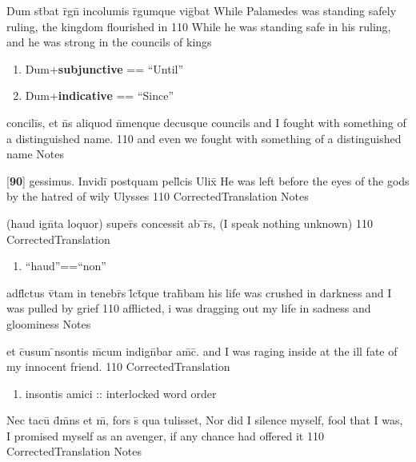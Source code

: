 \latline
  {Dum st\={}bat r\={}gn\={} incolumis r\={}gumque vig\={}bat}
  { While Palamedes was standing safely ruling, the kingdom flourished in }
  {110}
  { While he was standing safe in his ruling, and he was strong in the councils of kings }
  { \begin{enumerate}
  	\item Dum+\textbf{subjunctive} == ``Until''
  	\item Dum+\textbf{indicative} == ``Since''
  \end{enumerate} }


\latline
  {concili\={\macron {\i}}s, et n\={}s aliquod n\={}menque decusque}
  { councils and I fought with something of a distinguished name. }
  {110}
  { and even we fought with something of a distinguished name }
  { Notes }


\latline
  {[\textbf{90}] gessimus.  Invidi\={} postquam pell\={}cis Ulix\={\macron {\i}}}
  { He was left before the eyes of the gods by the hatred of wily Ulysses }
  {110}
  { CorrectedTranslation }
  { Notes }


\latline
  {(haud ign\={}ta loquor) super\={\macron {\i}}s concessit ab \={}r\={\macron {\i}}s,}
  { (I speak nothing unknown) }
  {110}
  { CorrectedTranslation }
  { \begin{enumerate}
  	\item ``haud''==``non''
  \end{enumerate} }


\latline
  {adfl\={\macron {\i}}ctus v\={\macron {\i}}tam in tenebr\={\macron {\i}}s l\={}ct\={}que trah\={}bam}
  { his life was crushed in darkness and I was pulled by grief }
  {110}
  { afflicted, i was dragging out my life in sadness and gloominess }
  { Notes }


\latline
  {et c\={}usum \={\macron {\i}}nsontis m\={}cum indign\={}bar am\={\macron {\i}}c\={\macron {\i}}.}
  { and I was raging inside at the ill fate of my innocent friend. }
  {110}
  { CorrectedTranslation }
  { \begin{enumerate}
  	\item insontis amici :: interlocked word order
  \end{enumerate} }


\latline
  {Nec tacu\={\macron {\i}} d\={}m\={}ns et m\={}, fors s\={\macron {\i}} qua tulisset,}
  { Nor did I silence myself, fool that I was, I promised myself as an avenger, if any chance had offered it }
  {110}
  { CorrectedTranslation }
  { Notes }


